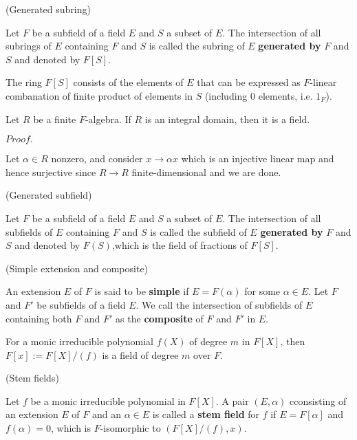 \documentclass{article}
\newcommand{\Pf}[1]{$Proof.$\par}
\begin{document}
\begin{definition}
    (Generated subring)\par
    Let $F$ be a subfield of a field $E$ and $S$ a subset of $E$. The intersection of all subrings of $E$ containing $F$ and $S$ is called the subring of $E$ \textbf{generated by} $F$ and $S$ and denoted by $F[S]$.
\end{definition}

\begin{lemma}
    The ring $F[S]$ consists of the elements of $E$ that can be expressed as $F$-linear combanation of finite product of elements in $S$ (including $0$ elements, i.e. $1_F$).
\end{lemma}

\begin{lemma}
    Let $R$ be a finite $F$-algebra. If $R$ is an integral domain, then it is a field.
\end{lemma}
\Pf\par
    Let $\alpha \in R$ nonzero, and consider $x\to \alpha x$ which is an injective linear map and hence surjective since $R\to R$ finite-dimensional and we are done.

\begin{definition}
    (Generated subfield)\par
    Let $F$ be a subfield of a field $E$ and $S$ a subset of $E$. The intersection of all subfields of $E$ containing $F$ and $S$ is called the subfield of $E$ \textbf{generated by} $F$ and $S$ and denoted by $F(S)$,which is the field of fractions of $F[S]$.
\end{definition}

\begin{definition}
    (Simple extension and composite)\par
    An extension $E$ of $F$ is said to be \textbf{simple} if $E = F(\alpha)$ for some $\alpha \in E$. Let $F$ and $F'$ be subfields of a field $E$. We call the intersection of subfields of $E$ containing both $F$ and $F'$ as the \textbf{composite} of $F$ and $F'$ in $E$. 
\end{definition}

\begin{proposition}
    For a monic irreducible polynomial $f(X)$ of degree $m$ in $F[X]$, then $F[x] := F[X]/(f)$ is a field of degree $m$ over $F$.
\end{proposition}

\begin{definition}
    (Stem fields)\par
    Let $f$ be a monic irreducible polynomial in $F[X]$. A pair $(E,\alpha)$ cconsisting of an extension $E$ of $F$ and an $\alpha \in E$ is called a \textbf{stem field} for $f$ if $E = F[\alpha]$ and $f(\alpha) = 0$, which is $F$-isomorphic to $(F[X]/(f),x)$.
\end{definition}
\end{document}
